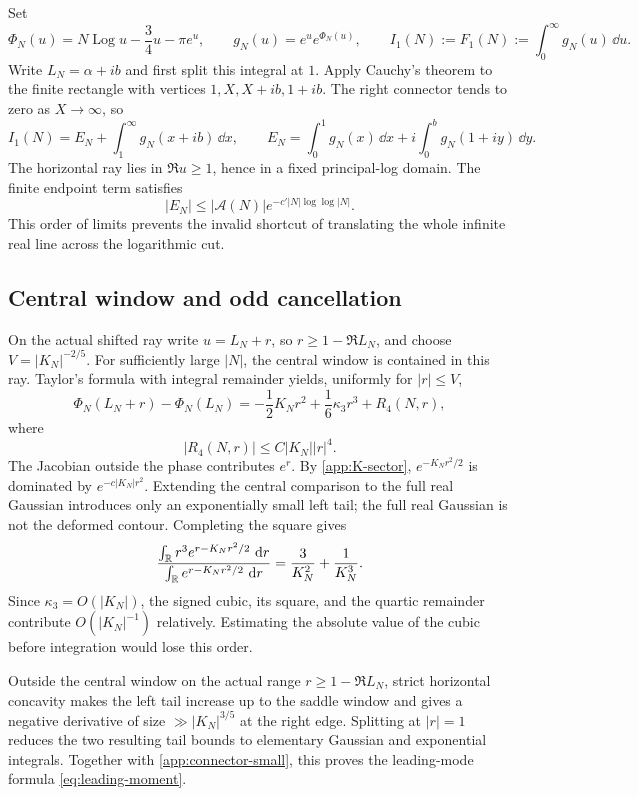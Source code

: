 Set
\[
 \Phi_N(u)=N\operatorname{Log}u-\frac34u-\pi e^u,
 \qquad g_N(u)=e^u e^{\Phi_N(u)},
 \qquad I_1(N):=F_1(N):=\int_0^\infty g_N(u)\,\dd u.
\]
Write $L_N=\alpha+ib$ and first split this integral at $1$.
Apply Cauchy's theorem to the finite rectangle with vertices
$1,X,X+ib,1+ib$.  The right connector tends to zero as $X\to\infty$, so
\begin{equation}\label{app:legal-contour}
 I_1(N)=E_N+\int_1^\infty g_N(x+ib)\,\dd x,
 \qquad
 E_N=\int_0^1g_N(x)\,\dd x+i\int_0^b g_N(1+iy)\,\dd y.
\end{equation}
The horizontal ray lies in $\Re u\ge1$, hence in a fixed principal-log
domain.  The finite endpoint term satisfies
\begin{equation}\label{app:connector-small}
 |E_N|\le|\mathcal A(N)|e^{-c'|N|\log\log|N|}.
\end{equation}
This order of limits prevents the invalid shortcut of translating the whole
infinite real line across the logarithmic cut.

\subsection{Central window and odd cancellation}

On the actual shifted ray write $u=L_N+r$, so $r\ge1-\Re L_N$, and choose
$V=|K_N|^{-2/5}$.  For sufficiently large $|N|$, the central window is
contained in this ray.  Taylor's formula with integral remainder yields,
uniformly for $|r|\le V$,
\begin{equation}\label{app:phase-four}
 \Phi_N(L_N+r)-\Phi_N(L_N)
 =-\frac12K_Nr^2+\frac16\kappa_3r^3+R_4(N,r),
\end{equation}
where
\begin{equation}\label{app:R4-bound}
 |R_4(N,r)|\le C|K_N||r|^4.
\end{equation}
The Jacobian outside the phase contributes $e^r$.  By
\eqref{app:K-sector}, $e^{-K_Nr^2/2}$ is dominated by
$e^{-c|K_N|r^2}$.  Extending the central comparison to the full real
Gaussian introduces only an exponentially small left tail; the full real
Gaussian is not the deformed contour.  Completing the square gives
\[
 \frac{\int_{\mathbb R}r^3e^{r-K_Nr^2/2}\,\,\mathrm d r}
 {\int_{\mathbb R}e^{r-K_Nr^2/2}\,\,\mathrm d r}
 =\frac3{K_N^2}+\frac1{K_N^3}.
\]
Since $\kappa_3=O(|K_N|)$, the signed cubic, its square, and the quartic
remainder contribute $O(|K_N|^{-1})$ relatively.  Estimating the absolute
value of the cubic before integration would lose this order.

Outside the central window on the actual range $r\ge1-\Re L_N$, strict
horizontal concavity makes the left tail increase up to the saddle window
and gives a negative derivative of size $\gg|K_N|^{3/5}$ at the right edge.
Splitting at $|r|=1$ reduces the two resulting tail bounds to elementary
Gaussian and exponential integrals.  Together with
\eqref{app:connector-small}, this proves the leading-mode formula
\eqref{eq:leading-moment}.

